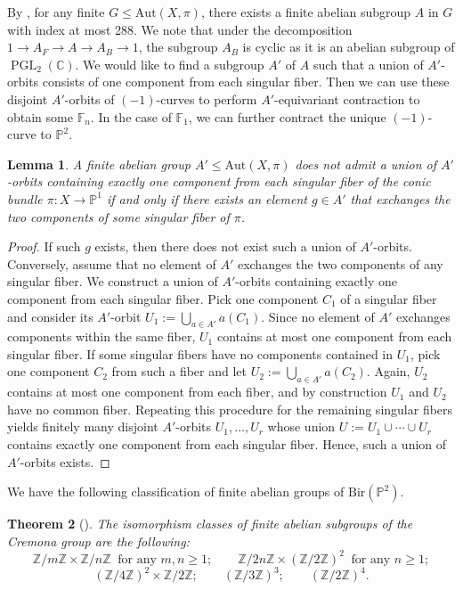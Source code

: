 \documentclass[a4paper,12pt,oneside]{amsart}
\numberwithin{equation}{section}
\newtheorem{theorem}{Theorem}[section]
\newtheorem{lemma}[theorem]{Lemma}
\theoremstyle{definition}
\theoremstyle{remark}
\newcommand{\PP}{\mathbb{P}}
\newcommand{\Ptwo}{\mathbb{P}^2}
\newcommand{\Bir}{\mathrm{Bir}}
\newcommand{\Aut}{\mathrm{Aut}}
\begin{document}
By \cite[Proposition 1.2.3]{prok17}, for any finite $G\leqslant\mathrm{Aut}(X,\pi)$, there exists a finite abelian subgroup $A$ in $G$ with index at most 288. We note that under the decomposition $1 \to A_F \to A \to A_{B} \to 1$, the subgroup $A_B$ is cyclic as it is an abelian subgroup of $\operatorname{PGL}_2(\mathbb{C})$. We would like to find a subgroup $A'$ of $A$ such that a union of $A'$-orbits consists of one component from each singular fiber. Then we can use these disjoint $A'$-orbits of $(-1)$-curves to perform $A'$-equivariant contraction to obtain some $\mathbb{F}_n$. In the case of $\mathbb{F}_1$, we can further contract the unique $(-1)$-curve to $\mathbb{P}^2$.

\begin{lemma}
A finite abelian group $A' \leqslant \Aut(X,\pi)$ does not admit a union of $A'$-orbits containing exactly one component from each singular fiber of the conic bundle $\pi:X\to \PP^1$ if and only if there exists an element $g\in A'$ that exchanges the two components of some singular fiber of $\pi$.
\end{lemma}

\begin{proof}
 If such $g$ exists, then there does not exist such a union of $A'$-orbits. Conversely, assume that no element of $A'$ exchanges the two components of any singular fiber.
We construct a union of $A'$-orbits containing exactly one component from each singular fiber. Pick one component $C_1$ of a singular fiber and consider its $A'$-orbit
$
U_1 := \bigcup_{a\in A'} a(C_1).
$
Since no element of $A'$ exchanges components within the same fiber, $U_1$ contains at most one component from each singular fiber.
If some singular fibers have no components contained in $U_1$, pick one component $C_2$ from such a fiber and let
$
U_2 := \bigcup_{a\in A'} a(C_2).
$
Again, $U_2$ contains at most one component from each fiber, and by construction $U_1$ and $U_2$ have no common fiber.
Repeating this procedure for the remaining singular fibers yields finitely many disjoint $A'$-orbits
$
U_1,\ldots,U_r$
whose union
$U := U_1 \cup \cdots \cup U_r$
contains exactly one component from each singular fiber.
Hence, such a union of $A'$-orbits exists.
\end{proof}
We have the following classification of finite abelian groups of $\Bir(\Ptwo)$.
\begin{theorem}[{\cite[Theorem 6]{blanc2006finiteabeliansubgroupscremona}}]\label{thm:finite-abelian-cremona}
The isomorphism classes of finite abelian subgroups of the Cremona group are the following:
\[
\mathbb{Z}/m\mathbb{Z}\times \mathbb{Z}/n\mathbb{Z}\ \text{ for any } m,n\ge 1;\qquad
\mathbb{Z}/2n\mathbb{Z}\times (\mathbb{Z}/2\mathbb{Z})^2\ \text{ for any } n\ge 1;
\]
\[
(\mathbb{Z}/4\mathbb{Z})^2\times \mathbb{Z}/2\mathbb{Z};\qquad
(\mathbb{Z}/3\mathbb{Z})^3;\qquad
(\mathbb{Z}/2\mathbb{Z})^4.
\]
\end{theorem}
\end{document}
